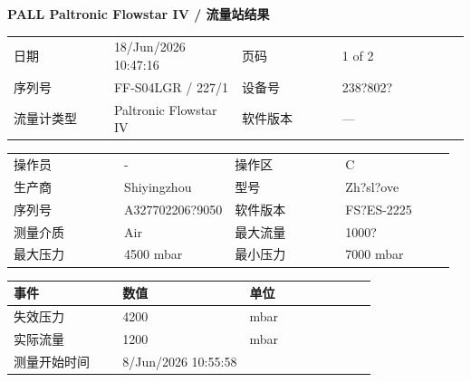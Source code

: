 \documentclass[UTF8,10pt,a4paper,fontset=fandol]{ctexart}
\newcommand{\fieldvalue}[1]{#1}
\begin{document}
\newpage

\begin{center}
\textbf{PALL \quad Paltronic Flowstar IV / 流量站结果}
\end{center}

\begin{tabular}{@{}p{0.22\linewidth}p{0.28\linewidth}p{0.22\linewidth}p{0.28\linewidth}@{}}
日期 &
\fieldvalue{18/Jun/2026 10:47:16}
&
页码 &
\fieldvalue{1 of 2}
\\[2pt]
序列号 &
\fieldvalue{FF-S04LGR / 227/1}
&
设备号 &
\fieldvalue{238?802?}
\\[2pt]
流量计类型 &
\fieldvalue{Paltronic Flowstar IV}
&
软件版本 &
\fieldvalue{---}
\end{tabular}

\vspace{1em}

\begin{tabular}{@{}p{0.25\linewidth}p{0.25\linewidth}p{0.25\linewidth}p{0.25\linewidth}@{}}
操作员 &
\fieldvalue{-}
&
操作区 &
\fieldvalue{C}
\\[2pt]
生产商 &
\fieldvalue{Shiyingzhou}
&
型号 &
\fieldvalue{Zh?sl?ove}
\\[2pt]
序列号 &
\fieldvalue{A327702206?9050}
&
软件版本 &
\fieldvalue{FS?ES-2225}
\\[2pt]
测量介质 &
\fieldvalue{Air}
&
最大流量 &
\fieldvalue{1000?}
\\[2pt]
最大压力 &
\fieldvalue{4500 mbar}
&
最小压力 &
\fieldvalue{7000 mbar}
\end{tabular}

\vspace{1em}

\begin{tabular}{@{}p{0.30\linewidth}p{0.35\linewidth}p{0.35\linewidth}@{}}
事件 & 数值 & 单位 \\
\hline
失效压力 &
\fieldvalue{4200}
&
mbar
\\
实际流量 &
\fieldvalue{1200}
&
mbar
\\
测量开始时间 &
\fieldvalue{8/Jun/2026 10:55:58}
&
\end{tabular}
\end{document}
